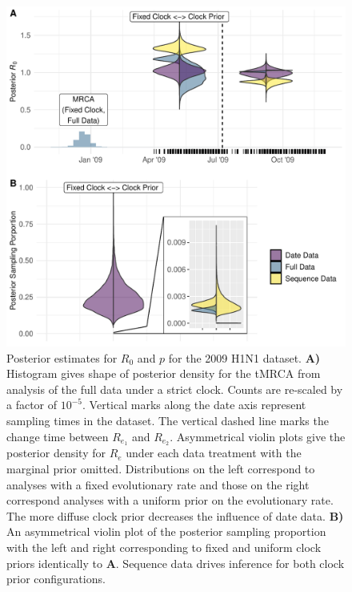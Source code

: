 \documentclass{article}
\begin{document}
\begin{figure}[H]
\centering
\includegraphics[width=1\linewidth]{../figures/h1n1Posts.pdf}
\caption{Posterior estimates for $R_0$ and $p$ for the 2009 H1N1 dataset. \textbf{A)} Histogram gives shape of posterior density for the tMRCA from analysis of the full data under a strict clock. Counts are re-scaled by a factor of $10^{-5}$. Vertical marks along the date axis represent sampling times in the dataset. The vertical dashed line marks the change time between $R_{e_1}$ and $R_{e_2}$. Asymmetrical violin plots give the posterior density for $R_e$ under each data treatment with the marginal prior omitted. Distributions on the left correspond to analyses with a fixed evolutionary rate and those on the right correspond analyses with a uniform prior on the evolutionary rate. The more diffuse clock prior decreases the influence of date data. \textbf{B)} An asymmetrical violin plot of the posterior sampling proportion with the left and right corresponding to fixed and uniform clock priors identically to \textbf{A}. Sequence data drives inference for both clock prior configurations.}
\label{fig:h1n1Fig}
\end{figure}

\end{document}
